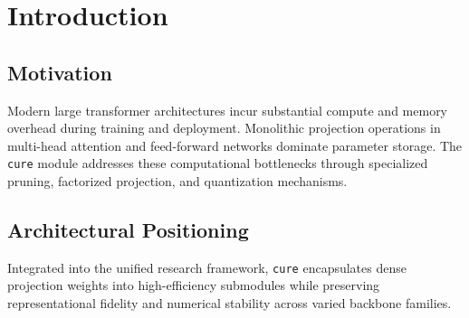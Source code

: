 \section{Introduction}

\subsection{Motivation}
Modern large transformer architectures incur substantial compute and memory overhead during training and deployment. Monolithic projection operations in multi-head attention and feed-forward networks dominate parameter storage. The \texttt{cure} module addresses these computational bottlenecks through specialized pruning, factorized projection, and quantization mechanisms.

\subsection{Architectural Positioning}
Integrated into the unified research framework, \texttt{cure} encapsulates dense projection weights into high-efficiency submodules while preserving representational fidelity and numerical stability across varied backbone families.
